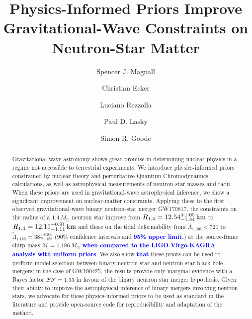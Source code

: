 \documentclass[twocolumn,linenumbers]{aastex631}
\newcommand{\blue}[1]{\textcolor{blue}{\textbf{#1}}}
\begin{document}
	
\title{Physics-Informed Priors Improve Gravitational-Wave Constraints on
  Neutron-Star Matter}


\author[0009-0000-7037-1809]{Spencer J. Magnall}

\author[0000-0002-8669-4300]{Christian Ecker}

\author[0000-0002-1330-7103]{Luciano Rezzolla}

\author[0000-0003-3763-1386]{Paul D. Lasky}


\author[0000-0002-9575-5152]{Simon R. Goode}


\begin{abstract}
 Gravitational-wave astronomy shows great promise in determining nuclear
 physics in a regime not accessible to terrestrial experiments. We
 introduce physics-informed priors constrained by nuclear theory and
 perturbative Quantum Chromodynamics calculations, as well as
 astrophysical measurements of neutron-star masses and radii. When these
 priors are used in gravitational-wave astrophysical inference, we show a
 significant improvement on nuclear-matter constraints. Applying these to
 the first observed gravitational-wave binary neutron-star merger
 GW170817, the constraints on the radius of a $1.4\,M_\odot$ neutron star
 improve from $R_{1.4} = {12.54^{+1.05}_{-1.54}} \, {\rm km}$ to $R_{1.4}
 = 12.11^{+0.91}_{-1.11} \,{\rm km}$ and those on the tidal deformability
 from $\tilde{\Lambda}_{1.186} < 720$ to $\tilde{\Lambda}_{1.186} =
 384^{+306}_{-158}$ ($90\%$ confidence intervals and \blue{95\% upper
   limit.}) at the source-frame chirp mass $\mathcal{M}=1.186\,M_\odot$
 \blue{when compared to the LIGO-Virgo-KAGRA analysis with uniform
   priors}. We also show \blue{that} these priors can be used to perform
 model selection between binary neutron star and neutron star-black hole
 mergers; in the case of GW190425, the results provide only marginal
 evidence with a Bayes factor $\mathcal{BF}=1.33$ in favour of the binary
 neutron star merger hypothesis.  Given their ability to improve the
 astrophysical inference of binary mergers involving neutron stars, we
 advocate for these physics-informed priors to be used as standard in the
 literature and provide open-source code for reproducibility and
 adaptation of the method.
\end{abstract}
	
\end{document}
